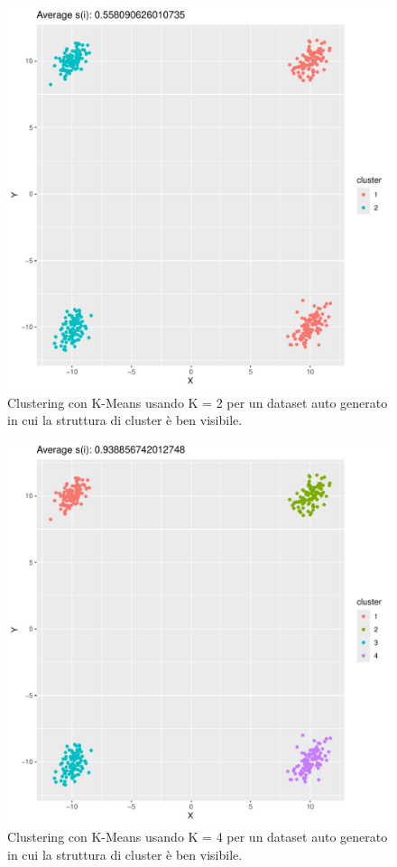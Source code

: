 \documentclass[italian]{article}
\begin{document}
			\begin{figure}[h]
				\includegraphics[width = \textwidth]{doc/clusters-2.pdf}
				\caption{Clustering con K-Means usando K = 2 per un dataset
				auto generato in cui la struttura di cluster è ben visibile. }
				\label{fig:c2}
			\end{figure}

			\begin{figure}[h]
				\includegraphics[width = \textwidth]{doc/clusters-4.pdf}
				\caption{Clustering con K-Means usando K = 4 per un dataset
				auto generato in cui la struttura di cluster è ben visibile. }
				\label{fig:c4}
			\end{figure}
\end{document}
